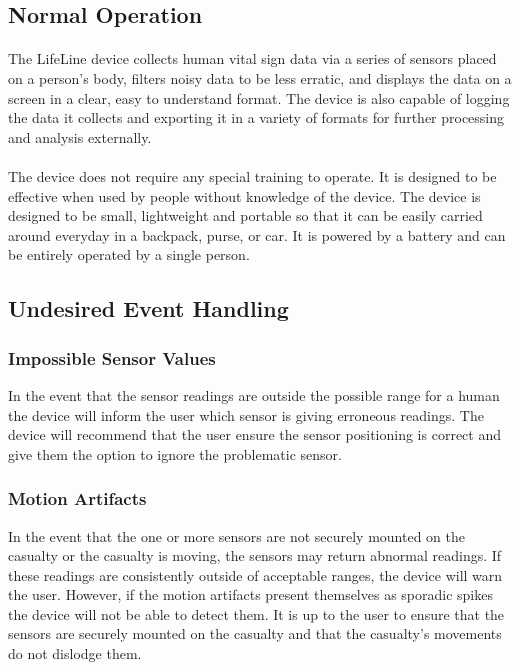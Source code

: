 \documentclass{article}
\begin{document}
	\subsection{Normal Operation}
	\paragraph{}
	The LifeLine device collects human vital sign data via a series of sensors placed on a person's body, filters noisy data to be less erratic, and displays the data on a screen in a clear, easy to understand format. The device is also capable of logging the data it collects and exporting it in a variety of formats for further processing and analysis externally. 
    \paragraph{}
    The device does not require any special training to operate. It is designed to be effective when used by people without knowledge of the device. The device is designed to be small, lightweight and portable so that it can be easily carried around everyday in a backpack, purse, or car. It is powered by a battery and can be entirely operated by a single person. 
    
	\subsection{Undesired Event Handling}
	\subsubsection{Impossible Sensor Values}
	In the event that the sensor readings are outside the possible range for a human the device will inform the user which sensor is giving erroneous readings. The device will recommend that the user ensure the sensor positioning is correct and give them the option to ignore the problematic sensor. 
	
	\subsubsection{Motion Artifacts}
	In the event that the one or more sensors are not securely mounted on the casualty or the casualty is moving, the sensors may return abnormal readings. If these readings are consistently outside of acceptable ranges, the device will warn the user.  However, if the motion artifacts present themselves as sporadic spikes the device will not be able to detect them. It is up to the user to ensure that the sensors are securely mounted on the casualty and that the casualty's movements do not dislodge them.
\end{document}

